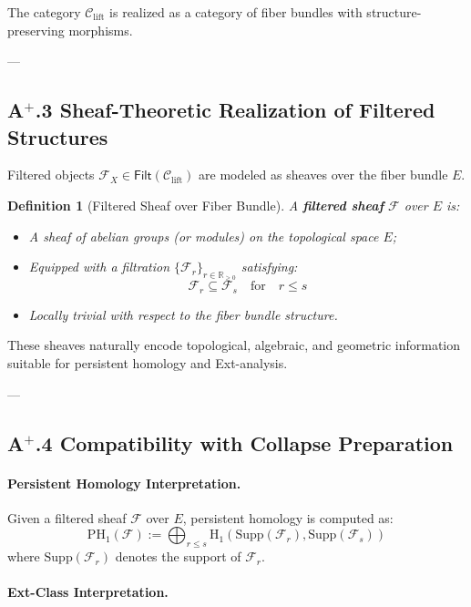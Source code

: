 \documentclass[11pt]{article}
\newtheorem{definition}[theorem]{Definition}
\begin{document}
The category $\mathcal{C}_{\mathrm{lift}}$ is realized as a category of fiber bundles with structure-preserving morphisms.

---

\subsection*{A$^{+}$.3 Sheaf-Theoretic Realization of Filtered Structures}

Filtered objects $\mathcal{F}_X \in \mathsf{Filt}(\mathcal{C}_{\mathrm{lift}})$ are modeled as sheaves over the fiber bundle $E$.

\begin{definition}[Filtered Sheaf over Fiber Bundle]
A \textbf{filtered sheaf} $\mathcal{F}$ over $E$ is:

\begin{itemize}
    \item A sheaf of abelian groups (or modules) on the topological space $E$;
    \item Equipped with a filtration $\{ \mathcal{F}_r \}_{r \in \mathbb{R}_{\geq 0}}$ satisfying:
    \[
    \mathcal{F}_r \subseteq \mathcal{F}_s \quad \text{for} \quad r \leq s
    \]
    \item Locally trivial with respect to the fiber bundle structure.
\end{itemize}
\end{definition}

These sheaves naturally encode topological, algebraic, and geometric information suitable for persistent homology and Ext-analysis.

---

\subsection*{A$^{+}$.4 Compatibility with Collapse Preparation}

\paragraph{Persistent Homology Interpretation.}

Given a filtered sheaf $\mathcal{F}$ over $E$, persistent homology is computed as:
\[
\mathrm{PH}_1(\mathcal{F}) := \bigoplus_{r \leq s} \mathrm{H}_1\left( \mathrm{Supp}(\mathcal{F}_r), \mathrm{Supp}(\mathcal{F}_s) \right)
\]
where $\mathrm{Supp}(\mathcal{F}_r)$ denotes the support of $\mathcal{F}_r$.

\paragraph{Ext-Class Interpretation.}
\end{document}
